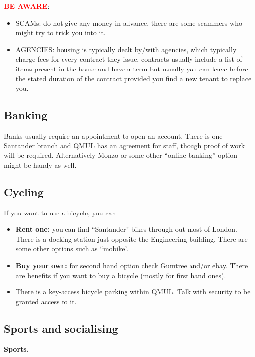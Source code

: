 \documentclass{article}
\begin{document}
\textbf{\textcolor{red}{BE AWARE}}:
\begin{itemize}
\color{red}
    \item SCAMs: do not give any money in advance, there are some scammers who might try to trick you into it.
    \item AGENCIES: housing is typically dealt by/with agencies, which typically charge fees for every contract they issue, contracts usually include a list of items present in the house and have a term but usually you can leave before the stated duration of the contract provided you find a new tenant to replace you. 
\end{itemize}

\subsection{Banking} 
Banks usually require an appointment to open an  account. There is one Santander branch and \href{http://www.hr.qmul.ac.uk/workqm/paygradingrewards/reward/benefits/index.html}{QMUL has an agreement} for staff, though proof of work will be required.
Alternatively Monzo or some other ``online banking'' option might be handy as well.

\subsection{Cycling}
If you want to use a bicycle, you can
\begin{itemize}
    \item \textbf{Rent one:} you can find ``Santander'' bikes through out most of London. There is a docking station just opposite the Engineering building. There are some other options such as ``mobike''.
    \item \textbf{Buy your own:} for second hand option check \href{https://www.gumtree.com/}{Gumtree} and/or ebay. There are  \href{http://hr.qmul.ac.uk/workqm/paygradingrewards/reward/benefits/cycletowork/}{benefits} if you want to buy a bicycle (mostly for first hand ones).
    \item There is a key-access bicycle parking within QMUL. Talk with security to be granted access to it.
\end{itemize}


\subsection{Sports and socialising}

\textbf{Sports.}
\end{document}
